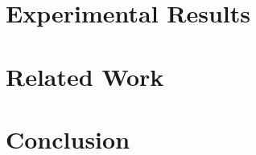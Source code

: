 \documentclass[10pt,conference]{IEEEtran}
\begin{document}


\section{Experimental Results}

\section{Related Work}
\section{Conclusion}



%
%
\end{document}
